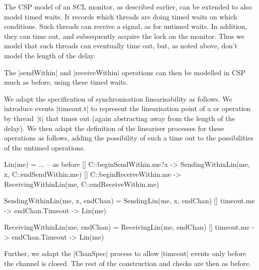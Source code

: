 The CSP model of an SCL monitor, as described earlier, can be extended to also
model timed waits.  It records which threads are doing timed waits on which
conditions.  Such threads can receive a signal, as for untimed waits.  In
addition, they can time out, and subsequently acquire the lock on the monitor.
Thus we model that such threads can eventually time out, but, as noted above,
don't model the length of the delay.

The |sendWithin| and |receiveWithin| operations can then be modelled in CSP
much as before, using these timed waits.



\inlineCSP

We adapt the specification of synchronisation linearisability as follows.  We
introduce events |timeout.t| to represent the linearisation point of a
 or  operation by thread~|t| that times
out (again abstracting away from the length of the delay).  We then adapt the
definition of the lineariser processes for these operations as follows, adding
the possibility of such a time out to the possibilities of the untimed
operations.
%
\begin{cspm}
Lin(me) = 
  ... -- as before
  [] C::beginSendWithin.me?x -> SendingWithinLin(me, x, C::endSendWithin.me)
  [] C::beginReceiveWithin.me -> ReceivingWithinLin(me, C::endReceiveWithin.me)

SendingWithinLin(me, x, endChan) = 
  SendingLin(me, x, endChan)
  [] timeout.me -> endChan.Timeout -> Lin(me)

ReceivingWithinLin(me, endChan) = 
  ReceivingLin(me, endChan) 
  [] timeout.me -> endChan.Timeout -> Lin(me)
\end{cspm}
%
Further, we adapt the |ChanSpec| process to allow |timeout| events only before
the channel is closed.  The rest of the construction and checks are then as
before. 

